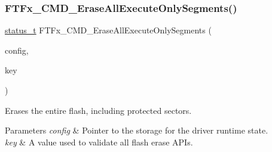 \subsubsection{\texorpdfstring{FTFx\_CMD\_EraseAllExecuteOnlySegments()}{FTFx\_CMD\_EraseAllExecuteOnlySegments()}}
{\footnotesize\ttfamily \mbox{\hyperlink{group__ksdk__common_gaaabdaf7ee58ca7269bd4bf24efcde092}{status\+\_\+t}} F\+T\+Fx\+\_\+\+C\+M\+D\+\_\+\+Erase\+All\+Execute\+Only\+Segments (\begin{DoxyParamCaption}\item[{\mbox{\hyperlink{group__ftfx__controller_gab0196063c05bffb4cd2f249699a3378c}{ftfx\+\_\+config\+\_\+t}} $\ast$}]{config,  }\item[{uint32\+\_\+t}]{key }\end{DoxyParamCaption})}



Erases the entire flash, including protected sectors. 


\begin{DoxyParams}{Parameters}
{\em config} & Pointer to the storage for the driver runtime state. \\
\hline
{\em key} & A value used to validate all flash erase A\+P\+Is.\\
\hline
\end{DoxyParams}

